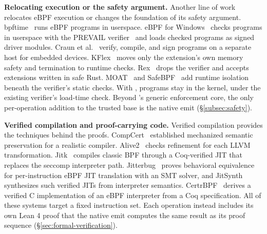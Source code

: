 \noindent\textbf{Relocating execution or the safety argument.}
Another line of work relocates eBPF execution or changes the foundation of its safety argument.
bpftime~\cite{zheng2025extending} runs eBPF programs in userspace.
eBPF for Windows~\cite{windows-ebpf} checks programs in userspace with the PREVAIL verifier~\cite{gershuni2019simple} and loads checked programs as signed driver modules.
Craun et al.~\cite{craun2023enabling} verify, compile, and sign programs on a separate host for embedded devices.
KFlex~\cite{dwivedi2024fast} moves only the extension's own memory safety and termination to runtime checks.
Rex~\cite{jia2025rex} drops the verifier and accepts extensions written in safe Rust.
MOAT~\cite{lu2024moat} and SafeBPF~\cite{soo2024safebpf} add runtime isolation beneath the verifier's static checks.
With \tool, programs stay in the kernel, under the existing verifier's load-time check.
Beyond \tool's generic enforcement core, the only per-operation addition to the trusted base is the native emit (\S\ref{subsec:safety}).

\noindent\textbf{Verified compilation and proof-carrying code.}
Verified compilation provides the techniques behind the \lang proofs.
CompCert~\cite{leroy2009formal} established mechanized semantic preservation for a realistic compiler.
Alive2~\cite{lopes2021alive2} checks refinement for each LLVM transformation.
Jitk~\cite{wang2014jitk} compiles classic BPF through a Coq-verified JIT that replaces the seccomp interpreter path.
Jitterbug~\cite{nelson2020specification} proves behavioral equivalence for per-instruction eBPF JIT translation with an SMT solver, and JitSynth~\cite{vangeffen2020jitsynth} synthesizes such verified JITs from interpreter semantics.
CertrBPF~\cite{yuan2022certrbpf} derives a verified C implementation of an eBPF interpreter from a Coq specification.
All of these systems target a fixed instruction set.
Each \lang operation instead includes its own Lean 4 proof that the native emit computes the same result as its proof sequence (\S\ref{sec:formal-verification}).

